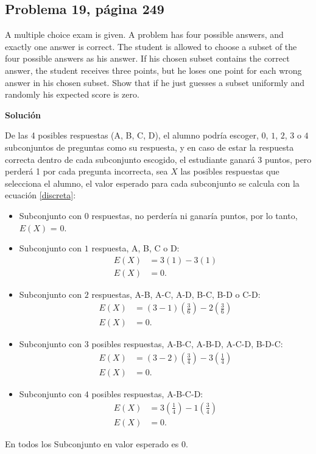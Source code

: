 \documentclass{article}
\begin{document}
\subsection{Problema 19, página 249}
A multiple choice exam is given. A problem has four possible answers, and exactly one answer is correct. The student is allowed to choose a subset of the four possible answers as his answer. If his chosen subset contains the correct answer, the student receives three points, but he loses one point for each wrong answer in his chosen subset. Show that if he just guesses a subset uniformly and randomly his expected score is zero.

\noindent \textbf{Solución}

\noindent De las 4 posibles respuestas (A, B, C, D), el alumno podría escoger, $0$, $1$, $2$, $3$ o $4$ subconjuntos de preguntas como su respuesta, y en caso de estar la respuesta correcta dentro de cada subconjunto escogido, el estudiante ganará 3 puntos, pero perderá 1 por cada pregunta incorrecta, sea $X$ las posibles respuestas que selecciona el alumno, el valor esperado para cada subconjunto se calcula con la ecuación \ref{discreta}:

\begin{itemize}
    \item Subconjunto con $0$ respuestas, no perdería ni ganaría puntos, por lo tanto, $E(X)$ = $0$.
    \item Subconjunto con $1$ respuesta, A, B, C o D: 
    \begin{align}
    \nonumber
    E{(X)}  & = 3(1)-3(1) \\ \nonumber
    E{(X)}  & = 0.
    \end{align}
    \item Subconjunto con $2$ respuestas, A-B, A-C, A-D, B-C, B-D o C-D: 
    \begin{align}
    \nonumber
    E{(X)}  & = (3-1)\left(\frac{3}{6}\right) - 2\left(\frac{3}{6}\right)  \\ \nonumber
    E{(X)}  & = 0.
    \end{align}
    \item Subconjunto con $3$ posibles respuestas, A-B-C, A-B-D, A-C-D, B-D-C: 
    \begin{align}
    \nonumber
    E{(X)}  & = (3-2)\left(\frac{3}{4}\right) - 3\left(\frac{1}{4}\right)  \\ \nonumber
    E{(X)}  & = 0.
    \end{align}
    \item Subconjunto con $4$ posibles respuestas, A-B-C-D:
    \begin{align}
    \nonumber
    E{(X)}  & = 3\left(\frac{1}{4}\right) - 1\left(\frac{3}{4}\right)  \\ \nonumber
    E{(X)}  & = 0.
    \end{align}  
\end{itemize}
En todos los Subconjunto en valor esperado es $0$.
\end{document}
